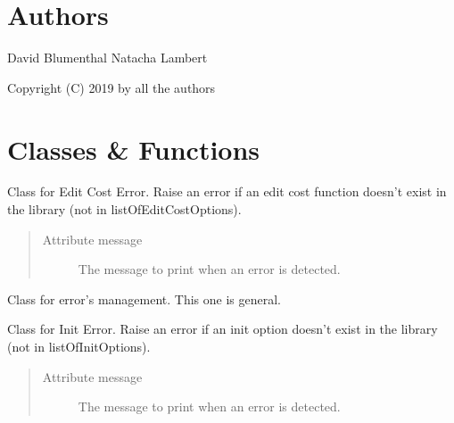 \documentclass[letterpaper,10pt,english]{sphinxmanual}
\begin{document}
\section{Authors}
\label{doc:authors}
David Blumenthal
Natacha Lambert

Copyright (C) 2019 by all the authors


\section{Classes \& Functions}
\label{doc:classes-functions}

\begin{fulllineitems}
\label{doc:PythonGedLib.EditCostError}
Class for Edit Cost Error. Raise an error if an edit cost function doesn't exist in the library (not in listOfEditCostOptions).
\begin{quote}\begin{description}
\item[{Attribute message}] \leavevmode
The message to print when an error is detected.

\end{description}\end{quote}

\end{fulllineitems}


\begin{fulllineitems}
\label{doc:PythonGedLib.Error}
Class for error's management. This one is general.

\end{fulllineitems}


\begin{fulllineitems}
\label{doc:PythonGedLib.InitError}
Class for Init Error. Raise an error if an init option doesn't exist in the library (not in listOfInitOptions).
\begin{quote}\begin{description}
\item[{Attribute message}] \leavevmode
The message to print when an error is detected.

\end{description}\end{quote}

\end{fulllineitems}
\end{document}
